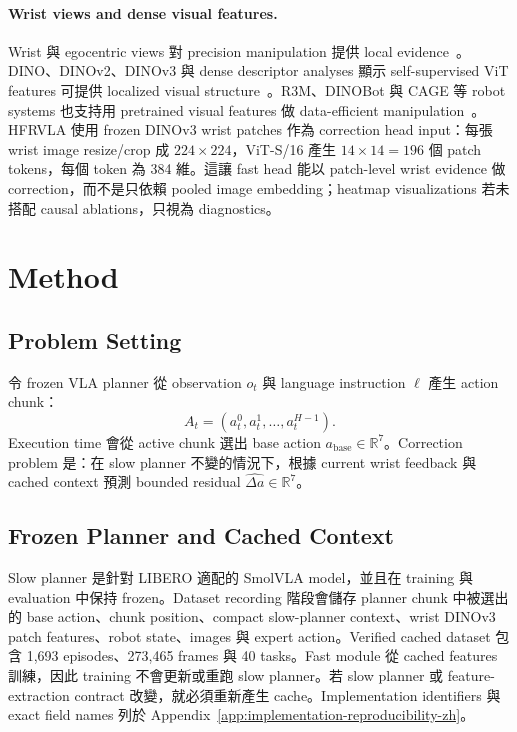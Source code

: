 \documentclass[10pt]{article}
\newcommand{\method}{HFRVLA}
\newcommand{\smolvla}{SmolVLA}
\newcommand{\abase}{a_{\mathrm{base}}}
\newcommand{\deltah}{\hat{\Delta a}}
\begin{document}
\paragraph{Wrist views and dense visual features.}
Wrist 與 egocentric views 對 precision manipulation 提供 local evidence~\citep{jangir2022lookcloser,chuang2024activevision}。DINO、DINOv2、DINOv3 與 dense descriptor analyses 顯示 self-supervised ViT features 可提供 localized visual structure~\citep{caron2021dino,oquab2023dinov2,simeoni2025dinov3,amir2021densevit}。R3M、DINOBot 與 CAGE 等 robot systems 也支持用 pretrained visual features 做 data-efficient manipulation~\citep{nair2023r3m,dipalo2024dinobot,xia2024cage}。\method{} 使用 frozen DINOv3 wrist patches 作為 correction head input：每張 wrist image resize/crop 成 $224\times224$，ViT-S/16 產生 $14\times14=196$ 個 patch tokens，每個 token 為 384 維。這讓 fast head 能以 patch-level wrist evidence 做 correction，而不是只依賴 pooled image embedding；heatmap visualizations 若未搭配 causal ablations，只視為 diagnostics。

\section{Method}

\subsection{Problem Setting}

令 frozen VLA planner 從 observation $o_t$ 與 language instruction $\ell$ 產生 action chunk：
\begin{equation}
  A_t = (a^0_t, a^1_t, \ldots, a^{H-1}_t).
\end{equation}
Execution time 會從 active chunk 選出 base action $\abase \in \mathbb{R}^7$。Correction problem 是：在 slow planner 不變的情況下，根據 current wrist feedback 與 cached context 預測 bounded residual $\deltah\in\mathbb{R}^7$。

\subsection{Frozen Planner and Cached Context}

Slow planner 是針對 LIBERO 適配的 \smolvla{} model，並且在 training 與 evaluation 中保持 frozen。Dataset recording 階段會儲存 planner chunk 中被選出的 base action、chunk position、compact slow-planner context、wrist DINOv3 patch features、robot state、images 與 expert action。Verified cached dataset 包含 1,693 episodes、273,465 frames 與 40 tasks。Fast module 從 cached features 訓練，因此 training 不會更新或重跑 slow planner。若 slow planner 或 feature-extraction contract 改變，就必須重新產生 cache。Implementation identifiers 與 exact field names 列於 Appendix~\ref{app:implementation-reproducibility-zh}。
\end{document}
